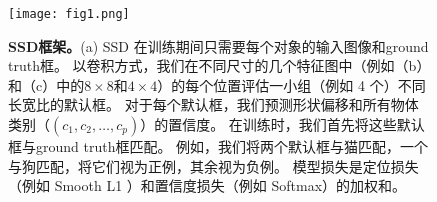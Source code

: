 \documentclass[../main.tex]{subfile}
\begin{document}
\begin{figure}[htb]
    \centering
    \texttt{[image: fig1.png]}
    \caption{\textbf{SSD框架。}(a) SSD 在训练期间只需要每个对象的输入图像和ground truth框。 以卷积方式，我们在不同尺寸的几个特征图中（例如（b）和（c）中的$ 8 \times  8 $和$ 4 \times  4$）的每个位置评估一小组（例如 4 个）不同长宽比的默认框。 对于每个默认框，我们预测形状偏移和所有物体类别（$\left( c_1, c_2, \ldots, c_p \right)$）的置信度。 在训练时，我们首先将这些默认框与ground truth框匹配。 例如，我们将两个默认框与猫匹配，一个与狗匹配，将它们视为正例，其余视为负例。 模型损失是定位损失（例如 Smooth L1 \cite{fast}）和置信度损失（例如 Softmax）的加权和。}
    \label{fig:fig1}
\end{figure}
\end{document}
